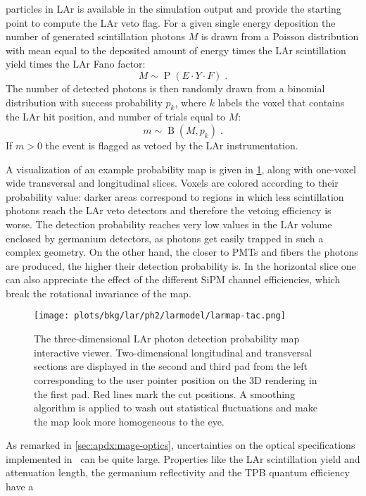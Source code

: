 particles in LAr is available in the simulation output and provide the starting point to
compute the LAr veto flag. For a given single energy deposition the number of generated
scintillation photons $M$ is drawn from a Poisson distribution with mean equal to the
deposited amount of energy times the LAr scintillation yield times the LAr Fano factor:
\[
  M \sim \operatorname{P}(E \cdot Y \cdot F) \;.
\]
The number of detected photons is then randomly drawn from a binomial distribution with
success probability $p_k$, where $k$ labels the voxel that contains the LAr hit position,
and number of trials equal to $M$:
\[
  m \sim \operatorname{B}(M, p_k) \;.
\]
If $m>0$ the event is flagged as vetoed by the LAr instrumentation.

A visualization of an example probability map is given in
\cref{fig:bkg:lar:ph2:larmap:tac}, along with one-voxel wide transversal and longitudinal
slices. Voxels are colored according to their probability value: darker areas correspond
to regions in which less scintillation photons reach the LAr veto detectors and therefore
the vetoing efficiency is worse. The detection probability reaches very low values in the
LAr volume enclosed by germanium detectors, as photons get easily trapped in such a
complex geometry. On the other hand, the closer to PMTs and fibers the photons are
produced, the higher their detection probability is. In the horizontal slice one can also
appreciate the effect of the different SiPM channel efficiencies, which break the
rotational invariance of the map.
\newpar
\begin{figure}
  \centering
  \texttt{[image: plots/bkg/lar/ph2/larmodel/larmap-tac.png]}
  \caption{%
    The three-dimensional LAr photon detection probability map interactive viewer.
    Two-dimensional longitudinal and transversal sections are displayed in the second and
    third pad from the left corresponding to the user pointer position on the 3D
    rendering in the first pad. Red lines mark the cut positions. A smoothing algorithm is
    applied to wash out statistical fluctuations and make the map look more homogeneous to
    the eye.
  }\label{fig:bkg:lar:ph2:larmap:tac}
\end{figure}
As remarked in \cref{sec:apdx:mage-optics}, uncertainties on the optical specifications
implemented in \mage\ can be quite large. Properties like the LAr scintillation yield and
attenuation length, the germanium reflectivity and the TPB quantum efficiency have a
